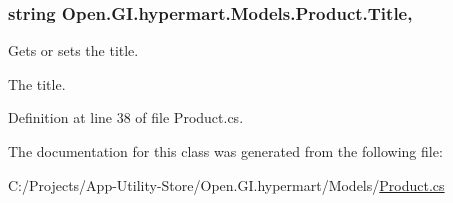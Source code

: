 \subsubsection[{Title}]{\setlength{\rightskip}{0pt plus 5cm}string Open.\+G\+I.\+hypermart.\+Models.\+Product.\+Title\hspace{0.3cm}{\ttfamily [get]}, {\ttfamily [set]}}\label{class_open_1_1_g_i_1_1hypermart_1_1_models_1_1_product_a877241a61c423e91b6b630df5ca811d0}


Gets or sets the title. 

The title. 

Definition at line 38 of file Product.\+cs.



The documentation for this class was generated from the following file\+:\begin{DoxyCompactItemize}
\item 
C\+:/\+Projects/\+App-\/\+Utility-\/\+Store/\+Open.\+G\+I.\+hypermart/\+Models/\hyperlink{_models_2_product_8cs}{Product.\+cs}\end{DoxyCompactItemize}
